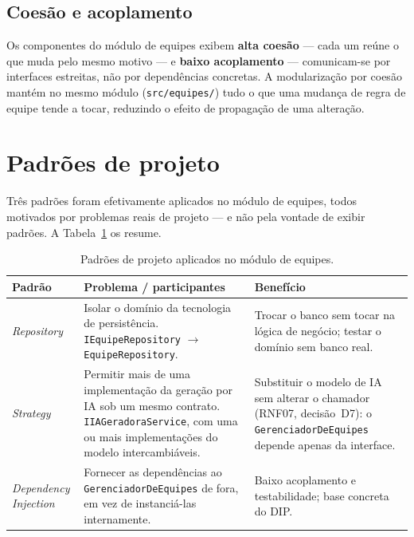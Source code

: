 \documentclass[a4paper,12pt,oneside,openany]{book}
\newif\iforientacoes
\newcommand{\orientacao}[1]{%
    \iforientacoes
        \begin{quote}
        \small\itshape\textbf{Orientação:} #1
        \end{quote}
    \fi
}
\begin{document}
\subsection{Coesão e acoplamento}

Os componentes do módulo de equipes exibem \textbf{alta coesão} --- cada um reúne
o que muda pelo mesmo motivo --- e \textbf{baixo acoplamento} --- comunicam-se por
interfaces estreitas, não por dependências concretas. A modularização por coesão
mantém no mesmo módulo (\texttt{src/equipes/}) tudo o que uma mudança de regra de
equipe tende a tocar, reduzindo o efeito de propagação de uma alteração.


\section{Padrões de projeto}

\orientacao{Para cada padrão de projeto efetivamente utilizado, indiquem o
problema que motivou sua aplicação, as classes ou componentes participantes,
como o padrão foi aplicado e qual benefício se espera obter. Não utilizem
padrões apenas para preencher esta seção.}

Três padrões foram efetivamente aplicados no módulo de equipes, todos motivados
por problemas reais de projeto --- e não pela vontade de exibir padrões. A
Tabela~\ref{tab:padroes} os resume.

\begin{table}[ht]
\centering
\caption{Padrões de projeto aplicados no módulo de equipes.}
\label{tab:padroes}
\begin{tabularx}{0.95\textwidth}{p{} p{} X}
\toprule
\textbf{Padrão} & \textbf{Problema / participantes} & \textbf{Benefício} \\
\midrule
\textit{Repository} & Isolar o domínio da tecnologia de persistência.
\texttt{IEquipeRepository} $\rightarrow$ \texttt{EquipeRepository}. & Trocar o
banco sem tocar na lógica de negócio; testar o domínio sem banco real. \\
\textit{Strategy} & Permitir mais de uma implementação da geração por IA sob um
mesmo contrato. \texttt{IIAGeradoraService}, com uma ou mais implementações do
modelo intercambiáveis. & Substituir o modelo de IA sem alterar o chamador
(RNF07, decisão~D7): o \texttt{GerenciadorDeEquipes} depende apenas da interface. \\
\textit{Dependency Injection} & Fornecer as dependências ao
\texttt{GerenciadorDeEquipes} de fora, em vez de instanciá-las internamente. &
Baixo acoplamento e testabilidade; base concreta do DIP. \\
\bottomrule
\end{tabularx}
\end{table}
\end{document}
